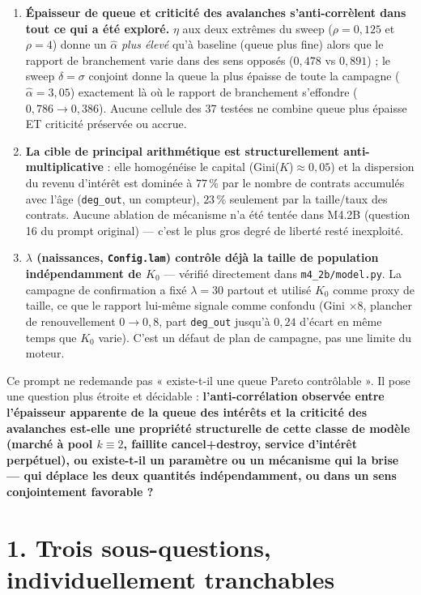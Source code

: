 \documentclass[11pt,a4paper]{article}
\newcommand{\code}[1]{\texttt{#1}}
\begin{document}
\begin{enumerate}
\item \textbf{Épaisseur de queue et criticité des avalanches
  s'anti-corrèlent dans tout ce qui a été exploré.} $\eta$ aux deux
  extrêmes du sweep ($\rho=0{,}125$ et $\rho=4$) donne un $\hat\alpha$
  \emph{plus élevé} qu'à baseline (queue plus fine) alors que le
  rapport de branchement varie dans des sens opposés ($0{,}478$ vs
  $0{,}891$) ; le sweep $\delta=\sigma$ conjoint donne la queue la plus
  épaisse de toute la campagne ($\hat\alpha=3{,}05$) exactement là où
  le rapport de branchement s'effondre ($0{,}786\to0{,}386$). Aucune
  cellule des 37 testées ne combine queue plus épaisse ET criticité
  préservée ou accrue.
\item \textbf{La cible de principal arithmétique est structurellement
  anti-multiplicative} : elle homogénéise le capital
  (Gini($K$)$\approx0{,}05$) et la dispersion du revenu d'intérêt est
  dominée à $77\,\%$ par le nombre de contrats accumulés avec l'âge
  (\code{deg\_out}, un compteur), $23\,\%$ seulement par la
  taille/taux des contrats. Aucune ablation de mécanisme n'a été
  tentée dans M4.2B (question 16 du prompt original) --- c'est le
  plus gros degré de liberté resté inexploité.
\item \textbf{$\lambda$ (naissances, \code{Config.lam}) contrôle déjà
  la taille de population indépendamment de $K_0$} --- vérifié
  directement dans \code{m4\_2b/model.py}. La campagne de confirmation
  a fixé $\lambda=30$ partout et utilisé $K_0$ comme proxy de taille,
  ce que le rapport lui-même signale comme confondu (Gini $\times 8$,
  plancher de renouvellement $0\to0{,}8$, part \code{deg\_out} jusqu'à
  $0{,}24$ d'écart en même temps que $K_0$ varie). C'est un défaut de
  plan de campagne, pas une limite du moteur.
\end{enumerate}

Ce prompt ne redemande pas « existe-t-il une queue Pareto
contrôlable ». Il pose une question plus étroite et décidable :
\textbf{l'anti-corrélation observée entre l'épaisseur apparente de la
queue des intérêts et la criticité des avalanches est-elle une
propriété structurelle de cette classe de modèle (marché à pool
$k\equiv2$, faillite cancel+destroy, service d'intérêt perpétuel), ou
existe-t-il un paramètre ou un mécanisme qui la brise --- qui déplace
les deux quantités indépendamment, ou dans un sens conjointement
favorable ?}

\section*{1. Trois sous-questions, individuellement tranchables}
\end{document}
